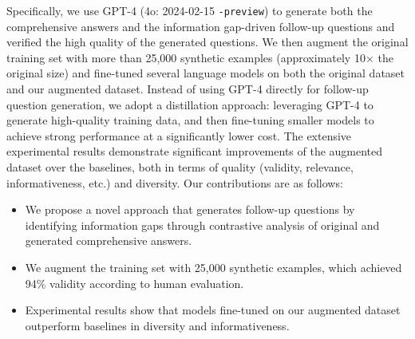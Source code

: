 Specifically, we use GPT-4 ({\ttfamily 4o: 2024-02-15} \texttt{-preview}) to generate both the comprehensive answers and the information gap-driven follow-up questions and verified the high quality of the generated questions. We then augment the original \fd{} training set with more than 25,000 synthetic examples (approximately 10$\times$ the original size) and fine-tuned several language models on both the original dataset and our augmented dataset. Instead of using GPT-4 directly for follow-up question generation, we adopt a distillation approach: leveraging GPT-4 to generate high-quality training data, and then fine-tuning smaller models to achieve strong performance at a significantly lower cost. The extensive experimental results demonstrate significant improvements of the augmented dataset over the baselines, both in terms of quality (validity, relevance, informativeness, etc.) and diversity.
Our contributions are as follows:

\begin{itemize}[leftmargin=10pt]
    \item We propose a novel approach that generates follow-up questions by identifying information gaps through contrastive analysis of original and generated comprehensive answers.
    \item We augment the \fd{} training set with 25,000 synthetic examples, which achieved 94\% validity according to human evaluation.
    \item Experimental results show that models fine-tuned on our augmented dataset outperform baselines in diversity and informativeness.
\end{itemize}